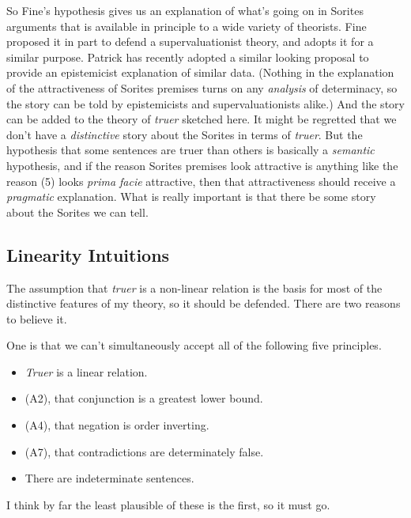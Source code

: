 So Fine's hypothesis gives us an explanation of what's going on in
Sorites arguments that is available in principle to a wide variety of
theorists. Fine proposed it in part to defend a supervaluationist
theory, and \citet{Keefe2000} adopts it for a similar purpose. Patrick
\citet{Greenough2003} has recently adopted a similar looking proposal to
provide an epistemicist explanation of similar data. (Nothing in the
explanation of the attractiveness of Sorites premises turns on any
\emph{analysis} of determinacy, so the story can be told by
epistemicists and supervaluationists alike.) And the story can be added
to the theory of \emph{truer} sketched here. It might be regretted that
we don't have a \emph{distinctive} story about the Sorites in terms of
\emph{truer}. But the hypothesis that some sentences are truer than
others is basically a \emph{semantic} hypothesis, and if the reason
Sorites premises look attractive is anything like the reason (5) looks
\emph{prima facie} attractive, then that attractiveness should receive a
\emph{pragmatic} explanation. What is really important is that there be
some story about the Sorites we can tell.

\hypertarget{linearity-intuitions}{%
\subsection{Linearity Intuitions}\label{linearity-intuitions}}

The assumption that \emph{truer} is a non-linear relation is the basis
for most of the distinctive features of my theory, so it should be
defended. There are two reasons to believe it.

One is that we can't simultaneously accept all of the following five
principles.

\begin{itemize}
\item
  \emph{Truer} is a linear relation.
\item
  (A2), that conjunction is a greatest lower bound.
\item
  (A4), that negation is order inverting.
\item
  (A7), that contradictions are determinately false.
\item
  There are indeterminate sentences.
\end{itemize}

I think by far the least plausible of these is the first, so it must go.

